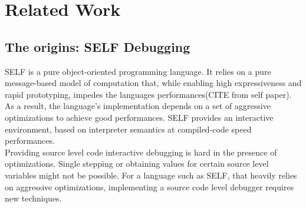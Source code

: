 
\chapter{Related Work} %

\label{Chapter3} %


\newcommand{\keyword}[1]{\textbf{#1}}
\newcommand{\tabhead}[1]{\textbf{#1}}
\newcommand{\code}[1]{\texttt{#1}}
\newcommand{\file}[1]{\texttt{\bfseries#1}}
\newcommand{\option}[1]{\texttt{\itshape#1}}

\section{The origins: SELF Debugging}\label{SELF}
SELF is a pure object-oriented programming language.
It relies on a pure message-based model of computation that, while enabling high expressiveness and rapid prototyping, impedes the languages performances(CITE from self paper).
As a result, the language's implementation depends on a set of aggressive optimizations to achieve good performances\cite{holzle1992debugging}.
SELF provides an interactive environment, based on interpreter semantics at compiled-code speed performances.\\

Providing source level code interactive debugging is hard in the presence of optimizations.
Single stepping or obtaining values for certain source level variables might not be possible.
For a language such as SELF, that heavily relies on aggressive optimizations, implementing a source code level debugger requires new techniques.\\

